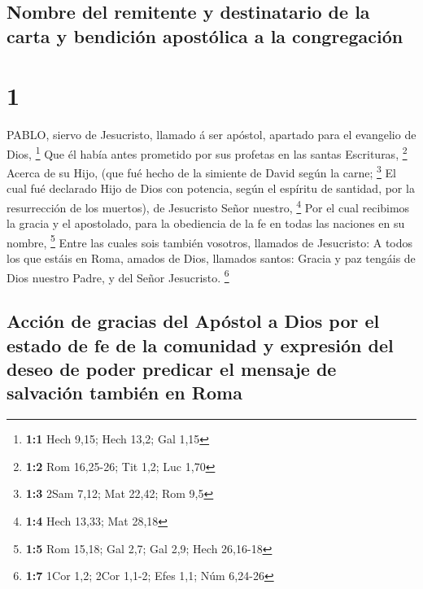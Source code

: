 \hypertarget{nombre-del-remitente-y-destinatario-de-la-carta-y-bendiciuxf3n-apostuxf3lica-a-la-congregaciuxf3n}{%
\subsection{Nombre del remitente y destinatario de la carta y bendición
apostólica a la
congregación}\label{nombre-del-remitente-y-destinatario-de-la-carta-y-bendiciuxf3n-apostuxf3lica-a-la-congregaciuxf3n}}

\hypertarget{section}{%
\section{1}\label{section}}

 PABLO, siervo de Jesucristo, llamado á ser apóstol,
apartado para el evangelio de Dios, \footnote{\textbf{1:1} Hech 9,15;
  Hech 13,2; Gal 1,15}  Que él había antes prometido por sus
profetas en las santas Escrituras, \footnote{\textbf{1:2} Rom 16,25-26;
  Tit 1,2; Luc 1,70}  Acerca de su Hijo, (que fué hecho de
la simiente de David según la carne; \footnote{\textbf{1:3} 2Sam 7,12;
  Mat 22,42; Rom 9,5}  El cual fué declarado Hijo de Dios
con potencia, según el espíritu de santidad, por la resurrección de los
muertos), de Jesucristo Señor nuestro, \footnote{\textbf{1:4} Hech
  13,33; Mat 28,18}  Por el cual recibimos la gracia y el
apostolado, para la obediencia de la fe en todas las naciones en su
nombre, \footnote{\textbf{1:5} Rom 15,18; Gal 2,7; Gal 2,9; Hech
  26,16-18}  Entre las cuales sois también vosotros,
llamados de Jesucristo:  A todos los que estáis en Roma,
amados de Dios, llamados santos: Gracia y paz tengáis de Dios nuestro
Padre, y del Señor Jesucristo. \footnote{\textbf{1:7} 1Cor 1,2; 2Cor
  1,1-2; Efes 1,1; Núm 6,24-26}

\hypertarget{acciuxf3n-de-gracias-del-apuxf3stol-a-dios-por-el-estado-de-fe-de-la-comunidad-y-expresiuxf3n-del-deseo-de-poder-predicar-el-mensaje-de-salvaciuxf3n-tambiuxe9n-en-roma}{%
\subsection{Acción de gracias del Apóstol a Dios por el estado de fe de
la comunidad y expresión del deseo de poder predicar el mensaje de
salvación también en
Roma}\label{acciuxf3n-de-gracias-del-apuxf3stol-a-dios-por-el-estado-de-fe-de-la-comunidad-y-expresiuxf3n-del-deseo-de-poder-predicar-el-mensaje-de-salvaciuxf3n-tambiuxe9n-en-roma}}

